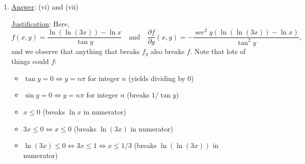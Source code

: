 \documentclass[12pt]{article}
\theoremstyle{definition}
\theoremstyle{underl}
\begin{document}
\begin{enumerate}[topsep=0.125in,itemsep=9mm]
	
		\item \ul{Answer}: (vi) and (vii)
		
		\vspace{3mm}
		\ul{Justification}: Here, 
		\[f(x,y)=\frac{\ln(\ln(3x))-\ln{x}}{\tan{y}}\quad\text{and}\quad\frac{\partial f}{\partial y}(x,y)=-\frac{\sec^2{y}\left(\ln(\ln(3x))-\ln{x}\right)}{\tan^2{y}},\]
		and we observe that anything that breaks $f_y$ also breaks $f$. Note that lots of things could  $f$:
		\begin{itemize}[itemsep=3mm]
			\item $\tan{y}=0\iff y=n\pi$ for integer $n$ (yields dividing by 0)
			\item $\sin{y}=0\iff y=n\pi$ for integer $n$ (breaks $1/\tan{y}$)
			\item $x\leq 0$ (breaks $\ln{x}$ in numerator)
			\item $3x\leq 0\iff x\leq 0$ (breaks $\ln(3x)$ in numerator)
			\item $\ln(3x)\leq 0\iff 3x\leq 1\iff x\leq 1/3$ (breaks $\ln(\ln(3x))$ in numerator)
		\end{itemize}
		

\end{enumerate}
\end{document}
